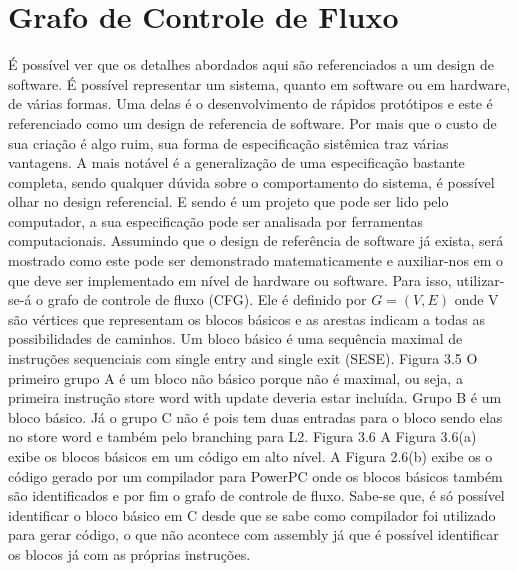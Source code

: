 \section{Grafo de Controle de Fluxo}
É possível ver que os detalhes abordados aqui são referenciados a um design de software. É possível representar um sistema, quanto em software ou em hardware, de várias formas. Uma delas é o desenvolvimento de rápidos protótipos e este é referenciado como um design de referencia de software. Por mais que o custo de sua criação é algo ruim, sua forma de especificação sistêmica traz várias vantagens. A mais notável é a generalização de uma especificação bastante completa, sendo qualquer dúvida sobre o comportamento do sistema, é possível olhar no design referencial. E sendo é um projeto que pode ser lido pelo computador, a sua especificação pode ser analisada por ferramentas computacionais.
Assumindo que o design de referência de software já exista, será mostrado como este pode ser demonstrado matematicamente e auxiliar-nos em o que deve ser implementado em nível de hardware ou software. Para isso, utilizar-se-á o grafo de controle de fluxo (CFG). Ele é definido por $ G = (V, E) $ onde V são vértices que representam os blocos básicos e as arestas indicam a todas as possibilidades de caminhos. Um bloco básico é uma sequência maximal de instruções sequenciais com single entry and single exit (SESE).
Figura 3.5
O primeiro grupo A é um bloco não básico porque não é maximal, ou seja, a primeira instrução store word with update deveria estar incluída. Grupo B é um bloco básico. Já o grupo C não é pois tem duas entradas para o bloco sendo elas no store word e também pelo branching para L2.
Figura 3.6
A Figura 3.6(a) exibe os blocos básicos em um código em alto nível. A Figura 2.6(b) exibe os o código gerado por um compilador para PowerPC onde os blocos básicos também são identificados e por fim o grafo de controle de fluxo. Sabe-se que, é só possível identificar o bloco básico em C desde que se sabe como compilador foi utilizado para gerar código, o que não acontece com assembly já que é possível identificar os blocos já com as próprias instruções.



